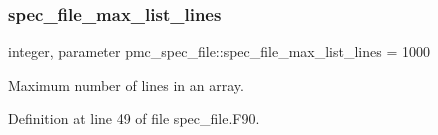 \subsubsection{\texorpdfstring{spec\+\_\+file\+\_\+max\+\_\+list\+\_\+lines}{spec\_file\_max\_list\_lines}}
{\footnotesize\ttfamily integer, parameter pmc\+\_\+spec\+\_\+file\+::spec\+\_\+file\+\_\+max\+\_\+list\+\_\+lines = 1000}



Maximum number of lines in an array. 



Definition at line 49 of file spec\+\_\+file.\+F90.

